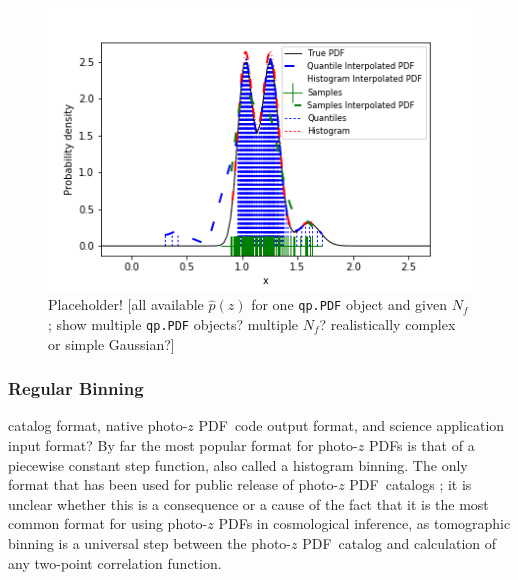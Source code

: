 \documentclass[\docopts]{\docclass}
\newcommand{\pz}{photo-$z$ PDF}
\begin{document}
\begin{figure}
  \includegraphics[width=0.9\columnwidth]{figures/qp_placeholder.png}
  \caption{Placeholder! [all available $\hat{p}(z)$ for one \texttt{qp.PDF} 
object and given $N_{f}$; show multiple \texttt{qp.PDF} objects? multiple 
$N_{f}$? realistically complex or simple Gaussian?]
  \label{fig:qp}}
\end{figure}

\subsubsection{Regular Binning}
\label{sec:bins}

catalog format, native \pz\ code output format, and science application input 
format?
By far the most popular format for \pz s is that of a piecewise constant step 
function, also called a histogram binning.  The only format that has been used 
for public release of \pz\ catalogs \citep{tanaka_photometric_2017, 
sheldon_photometric_2012}; it is unclear whether this is a consequence or a 
cause of the fact that it is the most common format for using \pz s in 
cosmological inference, as tomographic binning is a universal step between the 
\pz\ catalog and calculation of any two-point correlation function.  
\end{document}
